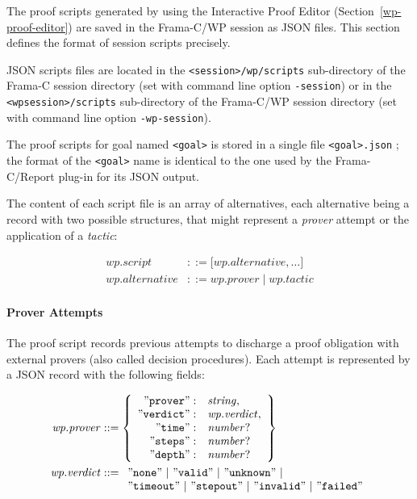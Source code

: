 The proof scripts generated by using the Interactive Proof Editor (Section~\ref{wp-proof-editor})
are saved in the \textsf{Frama-C/WP} session as \textsf{JSON} files. This section defines
the format of session scripts precisely.

\textsf{JSON} scripts files are located in the \texttt{<session>/wp/scripts} sub-directory
of the \textsf{Frama-C} session directory (set with command line option \texttt{-session})
or in the \texttt{<wpsession>/scripts} sub-directory of the \textsf{Frama-C/WP} session
directory (set with command line option \texttt{-wp-session}).

The proof scripts for goal named \texttt{<goal>} is stored in a single file \texttt{<goal>.json} ; the
format of the \texttt{<goal>} name is identical to the one used by the \textsf{Frama-C/Report} plug-in
for its \textsf{JSON} output.

The content of each script file is an array of alternatives, each alternative being a record with
two possible structures, that might represent a \textit{prover} attempt or the application of a
\textit{tactic}:

\begin{align*}
    \mathit{wp.script} &::= \mathtt{[} \mathit{wp.alternative} , \ldots \mathtt{]} \\
    \mathit{wp.alternative} &::= \mathit{wp.prover} \;|\; \mathit{wp.tactic}
\end{align*}

\paragraph{Prover Attempts} The proof script records previous attempts to discharge a proof obligation
with external provers (also called decision procedures).
Each attempt is represented by a \textsf{JSON} record with the following fields:

\begin{align*}
    \mathit{wp.prover} &::=
    \left\{
    \begin{array}{rl}
        \mathtt{"prover"}  :& \mathit{string}, \\
        \mathtt{"verdict"} :& \mathit{wp.verdict}, \\
        \mathtt{"time"}    :& \mathit{number}? \\
        \mathtt{"steps"}   :& \mathit{number}? \\
        \mathtt{"depth"}   :& \mathit{number}? \\
    \end{array}
    \right\} \\
    \mathit{wp.verdict} &::=
    \begin{array}[t]{l}
    \mathtt{"none"} ~|~
    \mathtt{"valid"} ~|~
    \mathtt{"unknown"} ~|~ \\
    \mathtt{"timeout"} ~|~
    \mathtt{"stepout"} ~|~
    \mathtt{"invalid"} ~|~
    \mathtt{"failed"}
    \end{array}
\end{align*}

